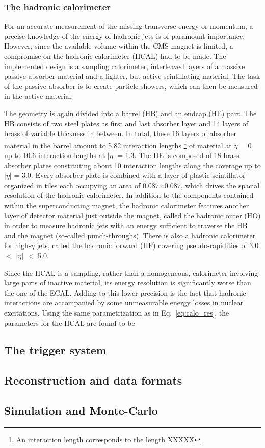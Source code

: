 \subsubsection*{The hadronic calorimeter}
For an accurate measurement of the missing transverse energy or momentum, a precise knowledge of the energy of hadronic jets is of 
paramount importance. However, since the available volume within the CMS magnet is limited, a compromise on the hadronic calorimeter (HCAL)
had to be made. The implemented design is a sampling calorimeter, interleaved layers of a massive passive absorber material and a lighter,
but active scintillating material. The task of the passive absorber is to create particle showers, which can then be measured in the active
material. 

The geometry is again divided into a barrel (HB) and an endcap (HE) part. The HB consists of two steel plates as first and last absorber layer and
14 layers of brass of variable thickness in between. In total, these 16 layers of absorber material in the barrel amount to 5.82 interaction lengths
\footnote{An interaction length corresponds to the length XXXXX} of material at $\eta$ = 0 up to 10.6 interaction lengths at $|\eta|$ = 1.3. The HE
is composed of 18 brass absorber plates constituting about 10 interaction lengths along the coverage up to $|\eta|$ = 3.0.
Every absorber plate is combined with a layer of plastic scintillator organized in tiles each occupying an area of 0.087$\times$0.087, which drives 
the spacial resolution of the hadronic calorimeter. In addition to the components contained within the superconducting magnet, the hadronic calorimeter
features another layer of detector material just outside the magnet, called the hadronic outer (HO) in order to measure hadronic jets with an energy
sufficient to traverse the HB and the magnet (so-called punch-throughs). There is also a hadronic calorimeter for high-$\eta$ jets, called the hadronic forward (HF) covering 
pseudo-rapidities of 3.0 $<$ $|\eta|$ $<$ 5.0.

Since the HCAL is a sampling, rather than a homogeneous, calorimeter involving large parts of inactive material, its energy resolution is significantly
worse than the one of the ECAL. Adding to this lower precision is the fact that hadronic interactions are accompanied by some unmeasurable energy 
losses in nuclear excitations. Using the same parametrization as in Eq.~\ref{eq:calo_res}, the parameters for the HCAL are found to be


\subsection{The trigger system}
\label{sub:cms_trigger}
\subsection{Reconstruction and data formats}
\label{sub:cms_reco}
\subsection{Simulation and Monte-Carlo}
\label{sub:cms_mc}
